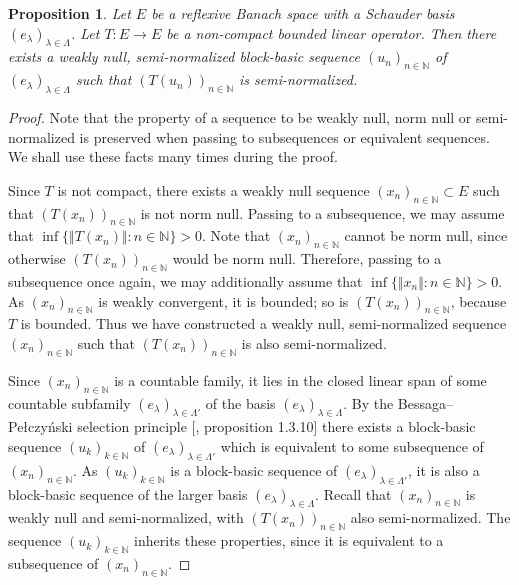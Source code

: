 \documentclass[12pt]{article}
\newtheorem{proposition}[theorem]{Proposition}
\begin{document}
\begin{proposition}\label{BlckBasForNonCompOp}
    Let $E$ be a reflexive Banach space with a Schauder 
    basis $(e_\lambda)_{\lambda\in\Lambda}$. Let $T:E\to E$ be a non-compact 
    bounded linear operator. Then there exists a weakly null, semi-normalized 
    block-basic 
    sequence $(u_n)_{n\in\mathbb{N}}$ of $(e_\lambda)_{\lambda\in\Lambda}$
    such that $(T(u_n))_{n\in\mathbb{N}}$ is semi-normalized.
\end{proposition} 
\begin{proof} Note that the property of a sequence to be weakly null, norm null
    or semi-normalized is preserved when passing to subsequences or 
    equivalent sequences. We shall use these facts many times during the proof.
    
    Since $T$ is not compact, there exists a weakly null 
    sequence $(x_n)_{n\in\mathbb{N}}\subset E$ such 
    that $(T(x_n))_{n\in\mathbb{N}}$ is not norm null. Passing to a subsequence,
    we may assume that $\inf\{\Vert T(x_n)\Vert: n\in\mathbb{N}\}>0$. Note 
    that $(x_n)_{n\in\mathbb{N}}$ cannot be norm null, since 
    otherwise $(T(x_n))_{n\in\mathbb{N}}$ would be norm null. Therefore, passing
    to a subsequence once again, we may additionally assume  
    that $\inf\{\Vert x_n\Vert: n\in\mathbb{N}\}>0$. As $(x_n)_{n\in\mathbb{N}}$
    is weakly convergent, it is bounded; so is $(T(x_n))_{n\in\mathbb{N}}$, 
    because $T$ is bounded. Thus we have constructed a weakly null, 
    semi-normalized sequence $(x_n)_{n\in\mathbb{N}}$ such 
    that $(T(x_n))_{n\in\mathbb{N}}$ is also semi-normalized.

    Since $(x_n)_{n\in\mathbb{N}}$ is a countable family, it lies in the 
    closed linear span of some countable 
    subfamily $(e_\lambda)_{\lambda\in\Lambda'}$ of the 
    basis $(e_\lambda)_{\lambda\in\Lambda}$. By the Bessaga--Pe{\l}czy\'nski 
    selection principle [\cite{KalAlbTopicsBanSpTh}, proposition 1.3.10] there 
    exists a block-basic sequence $(u_k)_{k\in\mathbb{N}}$ 
    of $(e_\lambda)_{\lambda\in\Lambda'}$ which is equivalent to some 
    subsequence of $(x_n)_{n\in\mathbb{N}}$. As $(u_k)_{k\in\mathbb{N}}$ is a 
    block-basic sequence of $(e_\lambda)_{\lambda\in\Lambda'}$, it is also a 
    block-basic sequence of the larger 
    basis $(e_\lambda)_{\lambda\in\Lambda}$. Recall 
    that $(x_n)_{n\in\mathbb{N}}$ is weakly null and semi-normalized, 
    with $(T(x_n))_{n\in\mathbb{N}}$ also semi-normalized. The 
    sequence $(u_k)_{k\in\mathbb{N}}$ inherits these properties, since it is 
    equivalent to a subsequence of $(x_n)_{n\in\mathbb{N}}$.
\end{proof}
\end{document}
